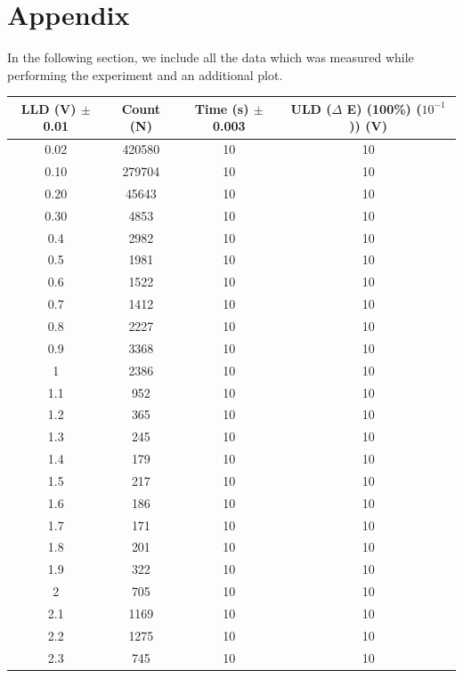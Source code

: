 \documentclass[a4paper]{report}
\numberwithin{equation}{section}
\begin{document}
\printbibliography

\chapter{Appendix} \label{sec:Appendix}

In the following section, we include all the data which was measured while performing the experiment and an additional plot.

\begin{table}[!ht]
    \centering
	\begin{tabular}{|c|c|c|c|}
    \hline
	LLD (V) $\pm$ 0.01 & Count (N) & Time (s) $\pm$ 0.003 & ULD ($\Delta$ E) (100\%) ($10^{-1}$)) (V) \\ \hline
        0.02 & 420580 & 10 & 10 \\ \hline
        0.10 & 279704 & 10 & 10 \\ \hline
        0.20 & 45643 & 10 & 10 \\ \hline
        0.30 & 4853 & 10 & 10 \\ \hline
        0.4 & 2982 & 10 & 10 \\ \hline
        0.5 & 1981 & 10 & 10 \\ \hline
        0.6 & 1522 & 10 & 10 \\ \hline
        0.7 & 1412 & 10 & 10 \\ \hline
        0.8 & 2227 & 10 & 10 \\ \hline
        0.9 & 3368 & 10 & 10 \\ \hline
        1 & 2386 & 10 & 10 \\ \hline
        1.1 & 952 & 10 & 10 \\ \hline
        1.2 & 365 & 10 & 10 \\ \hline
        1.3 & 245 & 10 & 10 \\ \hline
        1.4 & 179 & 10 & 10 \\ \hline
        1.5 & 217 & 10 & 10 \\ \hline
        1.6 & 186 & 10 & 10 \\ \hline
        1.7 & 171 & 10 & 10 \\ \hline
        1.8 & 201 & 10 & 10 \\ \hline
        1.9 & 322 & 10 & 10 \\ \hline
        2 & 705 & 10 & 10 \\ \hline
        2.1 & 1169 & 10 & 10 \\ \hline
        2.2 & 1275 & 10 & 10 \\ \hline
        2.3 & 745 & 10 & 10 \\ \hline

\end{tabular}
\end{table}
\end{document}
